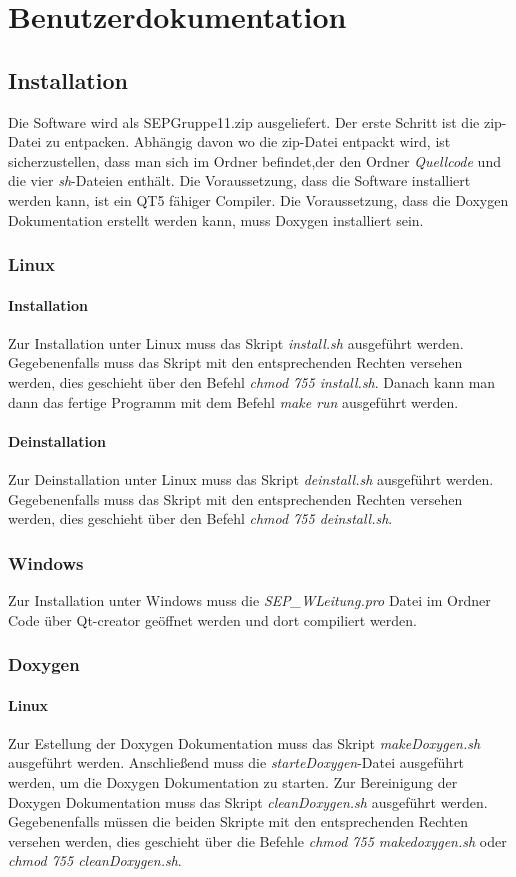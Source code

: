 \chapter{Benutzerdokumentation}

\section{Installation}
Die Software wird als SEPGruppe11.zip ausgeliefert. Der erste Schritt ist die zip-Datei zu entpacken. Abhängig davon wo die zip-Datei entpackt wird, ist sicherzustellen, dass man sich im Ordner befindet,der den Ordner \emph{Quellcode} und die vier \emph{sh}-Dateien enthält.
Die Voraussetzung, dass die Software installiert werden kann, ist ein QT5 fähiger Compiler.
Die Voraussetzung, dass die Doxygen Dokumentation erstellt werden kann, muss Doxygen installiert sein.
\subsection{Linux}
\subsubsection{Installation}
Zur Installation unter Linux muss das Skript \emph{install.sh} ausgeführt werden. Gegebenenfalls muss das Skript mit den entsprechenden Rechten versehen werden, dies geschieht über den Befehl \emph{chmod 755 install.sh}. Danach kann man dann das fertige Programm mit dem Befehl \emph{make run} ausgeführt werden.
\subsubsection{Deinstallation}
Zur Deinstallation unter Linux muss das Skript \emph{deinstall.sh} ausgeführt werden. Gegebenenfalls muss das Skript mit den entsprechenden Rechten versehen werden, dies geschieht über den Befehl \emph{chmod 755 deinstall.sh}.
\subsection{Windows}
Zur Installation unter Windows muss die \emph{SEP\_WLeitung.pro} Datei im Ordner Code über Qt-creator geöffnet werden und dort compiliert werden.

\subsection{Doxygen} \label{Installation Doxygen}
\subsubsection{Linux}
Zur Estellung der Doxygen Dokumentation muss das Skript \emph{makeDoxygen.sh} ausgeführt werden. Anschließend muss die \emph{starteDoxygen}-Datei ausgeführt werden, um die Doxygen Dokumentation zu starten. Zur Bereinigung der Doxygen Dokumentation muss das Skript \emph{cleanDoxygen.sh} ausgeführt werden. Gegebenenfalls müssen die beiden Skripte mit den entsprechenden Rechten versehen werden, dies geschieht über die Befehle \emph{chmod 755 makedoxygen.sh} oder \emph{chmod 755 cleanDoxygen.sh}. 

